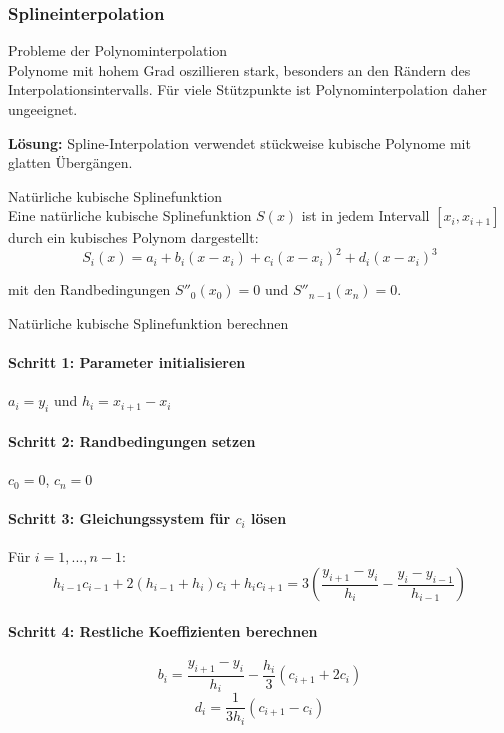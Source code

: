 \subsubsection{Splineinterpolation}

\begin{concept}{Probleme der Polynominterpolation}\\
Polynome mit hohem Grad oszillieren stark, besonders an den Rändern des Interpolationsintervalls. Für viele Stützpunkte ist Polynominterpolation daher ungeeignet.

\textbf{Lösung:} Spline-Interpolation verwendet stückweise kubische Polynome mit glatten Übergängen.
\end{concept}

\begin{definition}{Natürliche kubische Splinefunktion}\\
Eine natürliche kubische Splinefunktion $S(x)$ ist in jedem Intervall $[x_i, x_{i+1}]$ durch ein kubisches Polynom dargestellt:
$$S_i(x) = a_i + b_i(x - x_i) + c_i(x - x_i)^2 + d_i(x - x_i)^3$$

mit den Randbedingungen $S''_0(x_0) = 0$ und $S''_{n-1}(x_n) = 0$.
\end{definition}

\begin{KR}{Natürliche kubische Splinefunktion berechnen}\\
\paragraph{Schritt 1: Parameter initialisieren}
$a_i = y_i$ und $h_i = x_{i+1} - x_i$

\paragraph{Schritt 2: Randbedingungen setzen}
$c_0 = 0$, $c_n = 0$

\paragraph{Schritt 3: Gleichungssystem für $c_i$ lösen}
Für $i = 1, ..., n-1$:
$$h_{i-1} c_{i-1} + 2(h_{i-1} + h_i) c_i + h_i c_{i+1} = 3\left(\frac{y_{i+1} - y_i}{h_i} - \frac{y_i - y_{i-1}}{h_{i-1}}\right)$$

\paragraph{Schritt 4: Restliche Koeffizienten berechnen}
$$b_i = \frac{y_{i+1} - y_i}{h_i} - \frac{h_i}{3}(c_{i+1} + 2c_i)$$
$$d_i = \frac{1}{3h_i}(c_{i+1} - c_i)$$
\end{KR}

